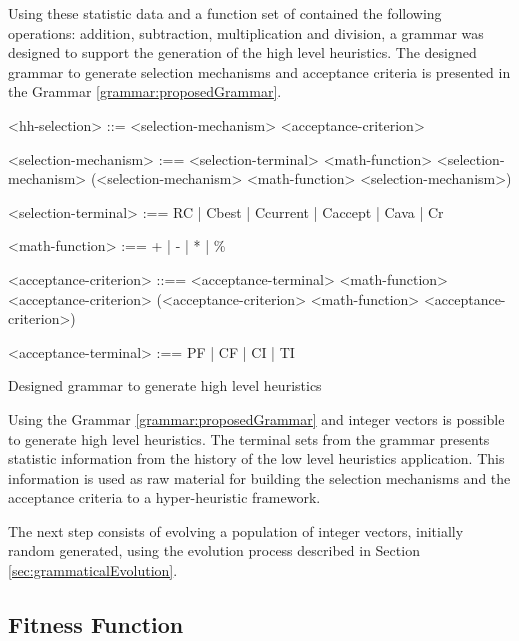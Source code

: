 \documentclass[conference]{IEEEtran}
\begin{document}
 Using these statistic data and a function set of contained the following operations: addition, subtraction, multiplication and division, a grammar was designed to support the generation of the high level heuristics. The designed grammar to generate selection mechanisms and acceptance criteria is presented in the Grammar \ref{grammar:proposedGrammar}.
 
 \begin{Grammar}
 	\begin{grammar}
 		<hh-selection> ::= <selection-mechanism> <acceptance-criterion> 
 		
 		<selection-mechanism> :==  <selection-terminal>   
 		\alt <selection-mechanism> <math-function> <selection-mechanism> 
 		\alt (<selection-mechanism> <math-function> <selection-mechanism>) 
 		
 		<selection-terminal> :== 
 		RC 
 		| Cbest 
 		| Ccurrent 
 		| Caccept 
 		| Cava 
 		| Cr
 		
 		<math-function> :== + 
 		| - 
 		| * 
 		| \%
 		
 		<acceptance-criterion> ::== <acceptance-terminal> 
 		\alt <acceptance-criterion> <math-function>
 		<acceptance-criterion>
 		\alt (<acceptance-criterion>  <math-function> <acceptance-criterion>) 
 		
 		<acceptance-terminal> :== PF | CF | CI | TI
 		
 		
 		
 	\end{grammar}
 	\caption{Designed grammar to generate high level heuristics}
 	\label{grammar:proposedGrammar}
 \end{Grammar}

Using the Grammar \ref{grammar:proposedGrammar} and integer vectors is possible to generate high level heuristics. The terminal sets from the grammar presents statistic information from the history of  the low level heuristics application. This information is used as raw material for building the selection mechanisms and the acceptance criteria to a hyper-heuristic framework.

The next step consists of evolving a population of integer vectors, initially random generated, using the evolution process described in Section \ref{sec:grammaticalEvolution}. 
\subsection{Fitness Function}
\label{subsection:fitnessFunction}
\end{document}
